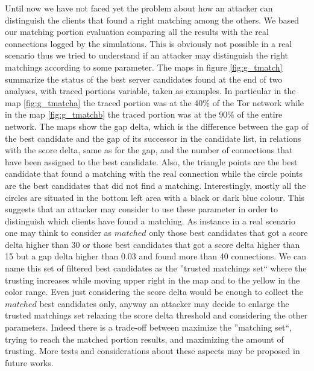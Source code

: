 Until now we have not faced yet the problem about how an attacker can distinguish
the clients that found a right matching among the others. We based our
matching portion evaluation comparing all the results with the real
connections logged by the simulations. This is obviously not possible
in a real scenario thus we tried to understand if an attacker may
distinguish the right matchings according to some parameter.
The maps in figure \ref{fig:g_tmatch} summarize the status of the best
server candidates found at the end of two analyses, with traced portions
variable, taken as
examples. In particular in the map \ref{fig:g_tmatcha} the traced
portion was at the 40\% of the Tor network while in the map
\ref{fig:g_tmatchb} the traced portion was at the 90\% of the entire
network. The maps show the gap delta, which is the difference between
the gap of the best
candidate and the gap of its successor in the candidate list,  in
relations with the score delta, same as for the gap, and the number of
connections that have been assigned to the best candidate. 
Also, the triangle points are the best candidate that found a matching
with the real connection while the circle points are the 
best candidates that did not find a matching.
Interestingly, mostly all the circles are situated in the bottom left
area with a black or dark blue colour. This suggests that an attacker
may consider to use these parameter in order to distinguish which
clients have found a matching. As instance in a real scenario one may
think to consider as $matched$ only those best candidates that got a
score delta higher than 30 or those best candidates that got a score
delta higher than 15 but a gap delta higher than 0.03 and found more
than 40 connections. We can name this set of filtered best candidates as
the ''trusted matchings set`` where the trusting increases while moving
upper right in the map and to the yellow in the color range. Even just
considering the score delta would be enough to collect the
$matched$ best candidates only, anyway an attacker may decide to enlarge
the trusted matchings set relaxing the score delta threshold and
considering the other parameters. Indeed there is a trade-off between
maximize the ''matching set``, trying to reach the matched portion
results, and maximizing the amount of
trusting. More tests and considerations about these aspects may be
proposed in future works.

